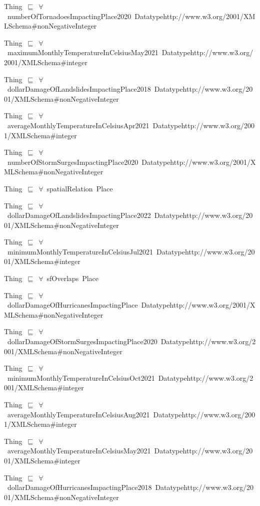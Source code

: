 \documentclass{article}
\begin{document}
Thing~\ensuremath{\sqsubseteq}~\ensuremath{\forall}~numberOfTornadoesImpactingPlace2020~Datatypehttp://www.w3.org/2001/XMLSchema#nonNegativeInteger~

Thing~\ensuremath{\sqsubseteq}~\ensuremath{\forall}~maximumMonthlyTemperatureInCelsiusMay2021~Datatypehttp://www.w3.org/2001/XMLSchema#integer~

Thing~\ensuremath{\sqsubseteq}~\ensuremath{\forall}~dollarDamageOfLandslidesImpactingPlace2018~Datatypehttp://www.w3.org/2001/XMLSchema#nonNegativeInteger~

Thing~\ensuremath{\sqsubseteq}~\ensuremath{\forall}~averageMonthlyTemperatureInCelsiusApr2021~Datatypehttp://www.w3.org/2001/XMLSchema#integer~

Thing~\ensuremath{\sqsubseteq}~\ensuremath{\forall}~numberOfStormSurgesImpactingPlace2020~Datatypehttp://www.w3.org/2001/XMLSchema#nonNegativeInteger~

Thing~\ensuremath{\sqsubseteq}~\ensuremath{\forall}~spatialRelation~Place~

Thing~\ensuremath{\sqsubseteq}~\ensuremath{\forall}~dollarDamageOfLandslidesImpactingPlace2022~Datatypehttp://www.w3.org/2001/XMLSchema#nonNegativeInteger~

Thing~\ensuremath{\sqsubseteq}~\ensuremath{\forall}~minimumMonthlyTemperatureInCelsiusJul2021~Datatypehttp://www.w3.org/2001/XMLSchema#integer~

Thing~\ensuremath{\sqsubseteq}~\ensuremath{\forall}~sfOverlaps~Place~

Thing~\ensuremath{\sqsubseteq}~\ensuremath{\forall}~dollarDamageOfHurricanesImpactingPlace~Datatypehttp://www.w3.org/2001/XMLSchema#nonNegativeInteger~

Thing~\ensuremath{\sqsubseteq}~\ensuremath{\forall}~dollarDamageOfStormSurgesImpactingPlace2020~Datatypehttp://www.w3.org/2001/XMLSchema#nonNegativeInteger~

Thing~\ensuremath{\sqsubseteq}~\ensuremath{\forall}~minimumMonthlyTemperatureInCelsiusOct2021~Datatypehttp://www.w3.org/2001/XMLSchema#integer~

Thing~\ensuremath{\sqsubseteq}~\ensuremath{\forall}~averageMonthlyTemperatureInCelsiusAug2021~Datatypehttp://www.w3.org/2001/XMLSchema#integer~

Thing~\ensuremath{\sqsubseteq}~\ensuremath{\forall}~averageMonthlyTemperatureInCelsiusMay2021~Datatypehttp://www.w3.org/2001/XMLSchema#integer~

Thing~\ensuremath{\sqsubseteq}~\ensuremath{\forall}~dollarDamageOfHurricanesImpactingPlace2018~Datatypehttp://www.w3.org/2001/XMLSchema#nonNegativeInteger~
\end{document}

